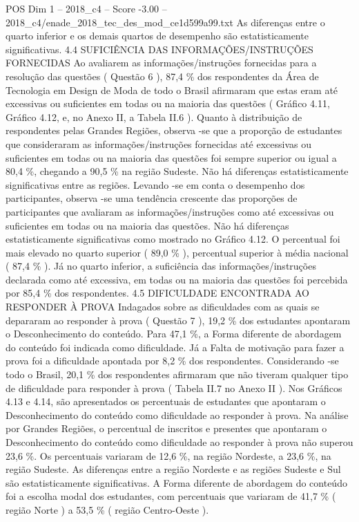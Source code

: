 \begin{textsample}{POS Dim 1 – 2018\_c4 – Score -3.00 – 2018\_c4/enade\_2018\_tec\_des\_mod\_ce1d599a99.txt}
As diferenças entre o quarto inferior e os demais quartos de desempenho são estatisticamente significativas. 4.4 SUFICIÊNCIA DAS INFORMAÇÕES/INSTRUÇÕES FORNECIDAS Ao avaliarem as informações/instruções fornecidas para a resolução das questões ( Questão 6 ), 87,4 \% dos respondentes da Área de Tecnologia em Design de Moda de todo o Brasil afirmaram que estas eram até excessivas ou suficientes em todas ou na maioria das questões ( Gráfico 4.11, Gráfico 4.12, e, no Anexo II, a Tabela II.6 ).
Quanto à distribuição de respondentes pelas Grandes Regiões, observa -se que a proporção de estudantes que consideraram as informações/instruções fornecidas até excessivas ou suficientes em todas ou na maioria das questões foi sempre superior ou igual a 80,4 \%, chegando a 90,5 \% na região Sudeste.
Não há diferenças estatisticamente significativas entre as regiões.
Levando -se em conta o desempenho dos participantes, observa -se uma tendência crescente das proporções de participantes que avaliaram as informações/instruções como até excessivas ou suficientes em todas ou na maioria das questões.
Não há diferenças estatisticamente significativas como mostrado no Gráfico 4.12.
O percentual foi mais elevado no quarto superior ( 89,0 \% ), percentual superior à média nacional ( 87,4 \% ).
Já no quarto inferior, a suficiência das informações/instruções declarada como até excessiva, em todas ou na maioria das questões foi percebida por 85,4 \% dos respondentes. 4.5 DIFICULDADE ENCONTRADA AO RESPONDER À PROVA Indagados sobre as dificuldades com as quais se depararam ao responder à prova ( Questão 7 ), 19,2 \% dos estudantes apontaram o Desconhecimento do conteúdo.
Para 47,1 \%, a Forma diferente de abordagem do conteúdo foi indicada como dificuldade.
Já a Falta de motivação para fazer a prova foi a dificuldade apontada por 8,2 \% dos respondentes.
Considerando -se todo o Brasil, 20,1 \% dos respondentes afirmaram que não tiveram qualquer tipo de dificuldade para responder à prova ( Tabela II.7 no Anexo II ).
Nos Gráficos 4.13 e 4.14, são apresentados os percentuais de estudantes que apontaram o Desconhecimento do conteúdo como dificuldade ao responder à prova.
Na análise por Grandes Regiões, o percentual de inscritos e presentes que apontaram o Desconhecimento do conteúdo como dificuldade ao responder à prova não superou 23,6 \%.
Os percentuais variaram de 12,6 \%, na região Nordeste, a 23,6 \%, na região Sudeste.
As diferenças entre a região Nordeste e as regiões Sudeste e Sul são estatisticamente significativas.
A Forma diferente de abordagem do conteúdo foi a escolha modal dos estudantes, com percentuais que variaram de 41,7 \% ( região Norte ) a 53,5 \% ( região Centro-Oeste ).

\end{textsample}
